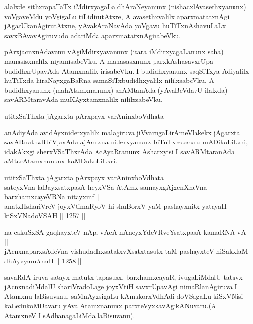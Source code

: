 \begin{artha}
alalxde sithxrapaTaTx iMdirxyagaLa dhAraNeyanunx (nishacxlAvasethxyanunx) yoVgaveMdu yoVgigaLu tiLidirutAtxre, A avasethxyalilx aparxmatatxnAgi jAgarUkanAgirutAtxne, yAvakAraNavAda yoVgavu huTiTxnAshavuLaLx savxBAvavAgiruvudo adariMda aparxmatatxnAgirabeVku.
\end{artha}

\begin{artha}
pArxjacnxnAdavanu vAgiMdirxyavanunx (itara iMdirxyagaLanunx saha) manasisxnalilx niyamisabeVku. A manasasxnunx parxkAshasavxrUpa budidhxrUpavAda Atamxnalilx irisabeVku. I budidhxyanunx saqSiTxya Adiyalilx huTiTxda hiraNayxgaBaRna samaSiTxbudidhxyalilx nililxsabeVku. A budidhxyanunx (mahAtamxnanunx) shAMtanAda (yAvaBeVdavU ilalxda) savARMtaravAda muKAyxtamxnalilx nililxsabeVku.
\end{artha}


\begin{shl}
utitxSaThxta jAgarxta pArxpayx varAninxboVdhata || 
\end{shl}

\begin{artha}
anAdiyAda avidAyxniderxyalilx malagiruva jiVvarugaLirA\break meVlakekx jAgarxta = savARnathaRbiVjavAda ajAcnxna niderxyanunx biTuTx ecacxru mADikoLiLxri, idakAkxgi sherxVSaThxrAda AcAyaRranunx Asharxyisi I savARMtaranAda aMtarAtamxnanunx kaMDukoLiLxri.
\end{artha}


\begin{shl}
utitxSaThxta jAgarxta pArxpayx varAninxboVdhata || \\
sateyxVna laBayxsatxpasA heyxVSa AtAmx samayxgAjxcnXneVna barxhamxcayeVRNa nitayxmf || \\
anatxHshariVreV joyxVtimaRyoV hi shuBorxV yaM pashayxnitx yatayaH kiSxVNadoVSAH \hfill || 1257 ||  
\end{shl}

\begin{shl}
na cakuSxSA gaqhayxteV nApi vAcA nAneyxYdeVRveYsatxpasA kamaRNA vA || \\
jAcnxnaparxsAdeVna vishudadhxsatatxvXsatxtasutx taM pashayxteV niSakxlaM dhAyxyamAnaH \hfill || 1258 ||  
\end{shl}

\begin{artha}
savaRdA iruva satayx matutx tapasusx, barxhamxcayaR, ivugaLiMdalU tatavx jAcnxnadiMdalU shariVradoLage joyxVtiH savxrUpavAgi nimaRlanAgiruva I Atamxnu laBisuvanu, saMnAyxsigaLu kAmakorxVdhAdi doVSagaLu kiSxVNisi kaLedukoMDavaru yAva Atamxnanunx parxteVyxka\-vAgikANuvaru.(A AtamxneV I sAdhanagaLiMda laBisuvanu).
\end{artha}

